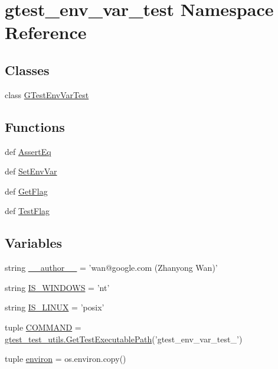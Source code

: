 \hypertarget{namespacegtest__env__var__test}{\section{gtest\-\_\-env\-\_\-var\-\_\-test \-Namespace \-Reference}
\label{dd/d84/namespacegtest__env__var__test}
}
\subsection*{\-Classes}
\begin{DoxyCompactItemize}
\item 
class \hyperlink{classgtest__env__var__test_1_1GTestEnvVarTest}{\-G\-Test\-Env\-Var\-Test}
\end{DoxyCompactItemize}
\subsection*{\-Functions}
\begin{DoxyCompactItemize}
\item 
def \hyperlink{namespacegtest__env__var__test_ad6332ca66e182fdc026b4a3320bfd5df}{\-Assert\-Eq}
\item 
def \hyperlink{namespacegtest__env__var__test_a6956c1471ed7a2d803a08e1b9f37fe24}{\-Set\-Env\-Var}
\item 
def \hyperlink{namespacegtest__env__var__test_ac0d1280b0a5b157b0cb13644bf8677d9}{\-Get\-Flag}
\item 
def \hyperlink{namespacegtest__env__var__test_af47985ae8c318065aede1d1b303cd6a8}{\-Test\-Flag}
\end{DoxyCompactItemize}
\subsection*{\-Variables}
\begin{DoxyCompactItemize}
\item 
string \hyperlink{namespacegtest__env__var__test_a629d61dfe4da763164a4d1a2d85b0afd}{\-\_\-\-\_\-author\-\_\-\-\_\-} = 'wan@google.\-com (\-Zhanyong \-Wan)'
\item 
string \hyperlink{namespacegtest__env__var__test_ab1b21b880253abfa3ab3dfc19b06814c}{\-I\-S\-\_\-\-W\-I\-N\-D\-O\-W\-S} = 'nt'
\item 
string \hyperlink{namespacegtest__env__var__test_a90c275a505433b6e9dc2e404ee55395e}{\-I\-S\-\_\-\-L\-I\-N\-U\-X} = 'posix'
\item 
tuple \hyperlink{namespacegtest__env__var__test_add010199942a26d17bd560c1ce462eeb}{\-C\-O\-M\-M\-A\-N\-D} = \hyperlink{namespacegtest__test__utils_a1bdf3cac86afa675ed37629b183048e9}{gtest\-\_\-test\-\_\-utils.\-Get\-Test\-Executable\-Path}('gtest\-\_\-env\-\_\-var\-\_\-test\-\_\-')
\item 
tuple \hyperlink{namespacegtest__env__var__test_a199b463c0623b1b68e7b45e7b01fe16c}{environ} = os.\-environ.\-copy()
\end{DoxyCompactItemize}


